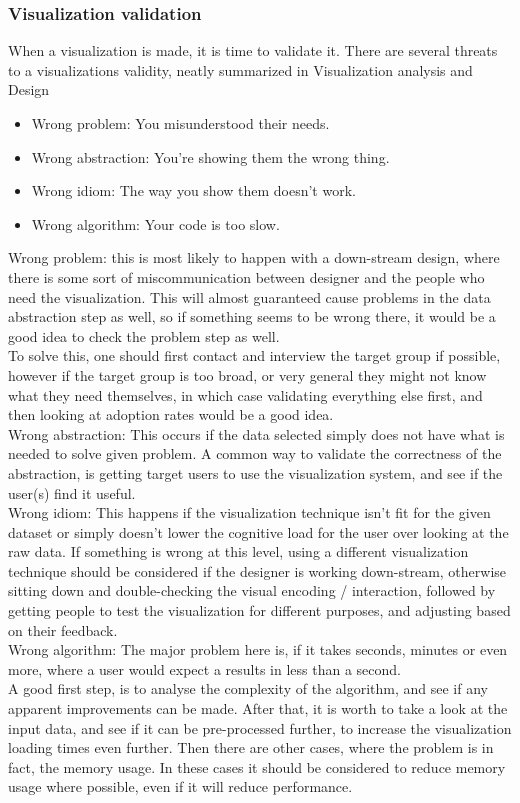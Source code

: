 \documentclass[Report.tex]{subfiles}
\begin{document}
	\subsubsection{Visualization validation}
	When a visualization is made, it is time to validate it. There are several threats to a visualizations validity, neatly summarized in Visualization analysis and Design \cite[75]{Tamara}
	\begin{itemize}
		\item Wrong problem: You misunderstood their needs.
		\item Wrong abstraction: You're showing them the wrong thing.
		\item Wrong idiom: The way you show them doesn't work.
		\item Wrong algorithm: Your code is too slow.
	\end{itemize}
	Wrong problem: this is most likely to happen with a down-stream design, where there is some sort of miscommunication between designer and the people who need the visualization. This will almost guaranteed cause problems in the data abstraction step as well, so if something seems to be wrong there, it would be a good idea to check the problem step as well.\\
	To solve this, one should first contact and interview the target group if possible, however if the target group is too broad, or very general they might not know what they need themselves, in which case validating everything else first, and then looking at adoption rates would be a good idea.\\
	Wrong abstraction: This occurs if the data selected simply does not have what is needed to solve given problem. A common way to validate the correctness of the abstraction, is getting target users to use the visualization system, and see if the user(s) find it useful.\\
	 Wrong idiom: This happens if the visualization technique isn't fit for the given dataset or simply doesn't lower the cognitive load for the user over looking at the raw data. If something is wrong at this level, using a different visualization technique should be considered if the designer is working down-stream, otherwise sitting down and double-checking the visual encoding / interaction, followed by getting people to test the visualization for different purposes, and adjusting based on their feedback.\\
	 Wrong algorithm: The major problem here is, if it takes seconds, minutes or even more, where a user would expect a results in less than a second. \\
	 A good first step, is to analyse the complexity of the algorithm, and see if any apparent improvements can be made. After that, it is worth to take a look at the input data, and see if it can be pre-processed further, to increase the visualization loading times even further. Then there are other cases, where the problem is in fact, the memory usage. In these cases it should be considered to reduce memory usage where possible, even if it will reduce performance.
\end{document}
